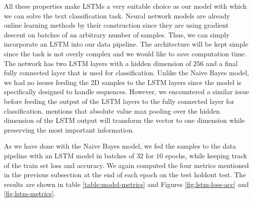 \documentclass[12pt]{extreport}
\begin{document}
All these properties make LSTMs a very suitable choice as our model with which we can solve the text classification task. Neural network models are already online learning methods by their construction since they are using gradient descent on batches of an arbitrary number of samples. Thus, we can simply incorporate an LSTM into our data pipeline. The architecture will be kept simple since the task is not overly complex and we would like to save computation time. The network has two LSTM layers with a hidden dimension of $256$ and a final fully connected layer that is used for classification. Unlike the Naive Bayes model, we had no issues feeding the 2D samples to the LSTM layers since the model is specifically designed to handle sequences. However, we encountered a similar issue before feeding the output of the LSTM layers to the fully connected layer for classification. \cite{maxpoolinglstm} mentions that absolute value max pooling over the hidden dimension of the LSTM output will transform the vector to one dimension while preserving the most important information.

As we have done with the Naive Bayes model, we fed the samples to the data pipeline with an LSTM model in batches of $32$ for $10$ epochs, while keeping track of the train set loss and accuracy. We again computed the four metrics mentioned in the previous subsection at the end of each epoch on the test holdout test. The results are shown in table \ref{table:model-metrics} and Figures \ref{fig:lstm-loss-acc} and \ref{fig:lstm-metrics}.
\end{document}
